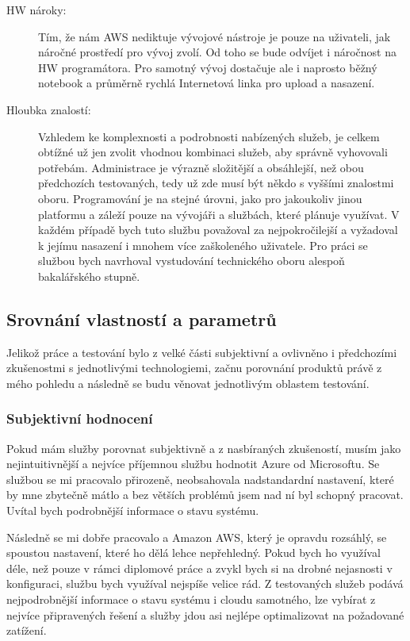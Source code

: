 \begin{description}
	\item [HW nároky:] Tím, že nám AWS nediktuje vývojové nástroje je pouze na uživateli, jak náročné prostředí pro vývoj zvolí. Od toho se bude odvíjet i náročnost na HW programátora. Pro samotný vývoj dostačuje ale i naprosto běžný notebook a průměrně rychlá Internetová linka pro upload a nasazení.
	\item [Hloubka znalostí:] Vzhledem ke komplexnosti a podrobnosti nabízených služeb, je celkem obtížné už jen zvolit vhodnou kombinaci služeb, aby správně vyhovovali potřebám. Administrace je výrazně složitější a obsáhlejší, než obou předchozích testovaných, tedy už zde musí být někdo s vyššími znalostmi oboru. Programování je na stejné úrovni, jako pro jakoukoliv jinou platformu a záleží pouze na vývojáři a službách, které plánuje využívat. V každém případě bych tuto službu považoval za nejpokročilejší a vyžadoval k jejímu nasazení i mnohem více zaškoleného uživatele. Pro práci se službou bych navrhoval vystudování technického oboru alespoň bakalářského stupně.
\end{description}

\subsection{Srovnání vlastností a parametrů}
Jelikož práce a testování bylo z velké části subjektivní a ovlivněno i předchozími zkušenostmi s jednotlivými technologiemi, začnu porovnání produktů právě z mého pohledu a následně se budu věnovat jednotlivým oblastem testování.

\subsubsection{Subjektivní hodnocení}
Pokud mám služby porovnat subjektivně a z nasbíraných zkušeností, musím jako nejintuitivnější a nejvíce příjemnou službu hodnotit Azure od Microsoftu. Se službou se mi pracovalo přirozeně, neobsahovala nadstandardní nastavení, které by mne zbytečně mátlo a bez větších problémů jsem nad ní byl schopný pracovat. Uvítal bych podrobnější informace o stavu systému.

Následně se mi dobře pracovalo a Amazon AWS, který je opravdu rozsáhlý, se spoustou nastavení, které ho dělá lehce nepřehledný. Pokud bych ho využíval déle, než pouze v rámci diplomové práce a zvykl bych si na drobné nejasnosti v konfiguraci, službu bych využíval nejspíše velice rád. Z testovaných služeb podává nejpodrobnější informace o stavu systému i cloudu samotného, lze vybírat z nejvíce připravených řešení a služby jdou asi nejlépe optimalizovat na požadované zatížení.

